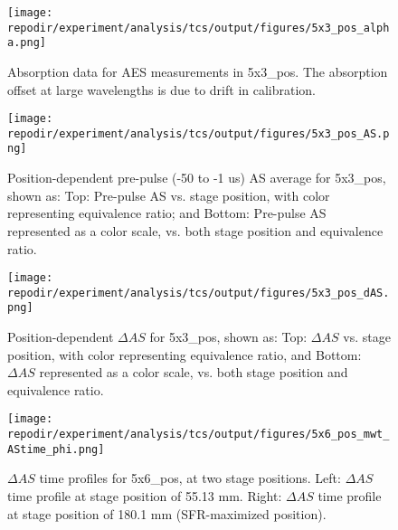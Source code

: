 \begin{figure}[]
\centering
\texttt{[image: \\repodir/experiment/analysis/tcs/output/figures/5x3\_pos\_alpha.png]}
\caption{Absorption data for AES measurements in 5x3\_pos. The absorption offset at large wavelengths is due to drift in calibration.}
\label{fig:SI_5x3_pos_alpha}
\end{figure}%






\begin{figure}[]
\centering
\texttt{[image: \\repodir/experiment/analysis/tcs/output/figures/5x3\_pos\_AS.png]}
\caption{Position-dependent pre-pulse (-50 to -1 us) AS average for 5x3\_pos, shown as: Top: Pre-pulse AS vs. stage position, with color representing equivalence ratio; and Bottom: Pre-pulse AS represented as a color scale, vs. both stage position and equivalence ratio.}
\label{fig:SI_5x3_pos_AS}
\end{figure}


\begin{figure}[]
    \centering
    \texttt{[image: \\repodir/experiment/analysis/tcs/output/figures/5x3\_pos\_dAS.png]} 
    \caption{Position-dependent $\Delta AS$ for 5x3\_pos, shown as: Top: $\Delta AS$ vs. stage position, with color representing equivalence ratio, and Bottom: $\Delta AS$ represented as a color scale, vs. both stage position and equivalence ratio.}
    \label{fig:SI_5x3_pos_dAS}
\end{figure}


\begin{figure}[]
\centering
\texttt{[image: \\repodir/experiment/analysis/tcs/output/figures/5x6\_pos\_mwt\_AStime\_phi.png]}
\caption{$\Delta AS$ time profiles for 5x6\_pos, at two stage positions. Left: $\Delta AS$ time profile at stage position of 55.13 mm. Right: $\Delta AS$ time profile at stage position of 180.1 mm (SFR-maximized position).}
\label{fig:SI_5x6_pos_mwt_AStime_phi}
\end{figure}


